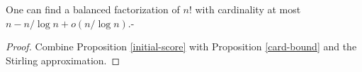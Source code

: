 \begin{theorem}
\label{erdos-sol-1}
\leanok
One can find a balanced factorization of $n!$ with cardinality at most
  $n - n / \log n + o(n / \log n)$.-
\end{theorem}
\begin{proof}
\leanok
Combine Proposition \ref{initial-score} with Proposition \ref{card-bound} and
  the Stirling approximation.
\end{proof}
